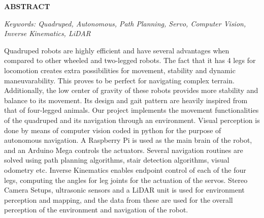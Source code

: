 \begin{center}
\Large \textbf{ABSTRACT}\\
\end{center}
\vspace{0.5cm} 

\textit{Keywords: Quadruped, Autonomous, Path Planning, Servo, Computer Vision, Inverse Kinematics, LiDAR}
\vspace{0.5cm}

Quadruped robots are highly efficient and have several advantages when compared to other wheeled and two-legged robots. The fact that it has 4 legs for locomotion creates extra possibilities for movement, stability and dynamic maneuvarability. This proves to be perfect for navigating complex terrain. Additionally, the low center of gravity of these robots provides more stability and balance to its movement. Its design and gait pattern are heavily inspired from that of four-legged animals. Our project implements the movement functionalities of the quadruped and its navigation through an environment. Visual perception is done by means of computer vision coded in python for the purpose of autonomous navigation. A Raspberry Pi is used as the main brain of the robot, and an Arduino Mega controls the actuators. Several navigation routines are solved using path planning algorithms, stair detection algorithms, visual odometry etc. Inverse Kinematics enables endpoint control of each of the four legs, computing the angles for leg joints for the actuation of the servos. Stereo Camera Setups, ultrasonic sensors and a LiDAR unit is used for environment perception and mapping, and the data from these are used for the overall perception of the environment and navigation of the robot.